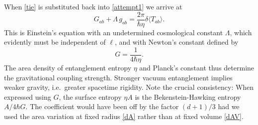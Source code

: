 \documentclass[aps,prd,showpacs,groupedaddress,nofootinbib,longbibliography,12pt]{revtex4-1}
\def\beq{\begin{equation}}
\def\eeq{\end{equation}}
\def\la{\langle}
\def\ra{\rangle}
\def\d{\delta}\def\D{\Delta}
\begin{document}
When \eqref{tie} is substituted back into \eqref{attempt1} we arrive at
%
\beq\label{bingo}
G_{ab} +\Lambda \,g_{ab}= \frac{2\pi}{\hbar\eta}\d\la T_{ab}\ra.
\eeq
% 
This is Einstein's equation with an undetermined cosmological constant $\Lambda$, which evidently must 
be independent of $\ell$,
and with Newton's constant defined by 
%
\beq
G=\frac{1}{4\hbar\eta}.
\eeq
%
The area density of entanglement entropy $\eta$ and Planck's constant thus determine the gravitational coupling strength.
Stronger vacuum entanglement implies weaker gravity, i.e.\ greater spacetime rigidity. 
Note the crucial consistency: When expressed using $G$, the surface entropy $\eta A$ is the Bekenstein-Hawking entropy 
$A/4\hbar G$. The coefficient would have been off by the factor $(d+1)/3$ had we used the area variation at fixed
radius \eqref{dA} rather than at fixed volume \eqref{dAV}. 
\end{document}
